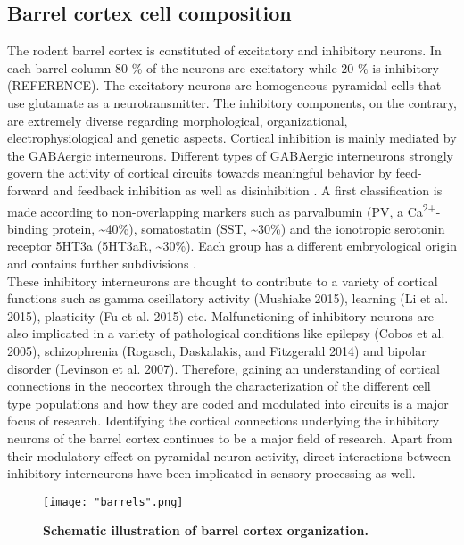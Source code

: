\subsection{Barrel cortex cell composition} 
The rodent barrel cortex is constituted of excitatory and inhibitory neurons. In each barrel column  80 \% of the neurons are excitatory while 20 \% is inhibitory (REFERENCE). The excitatory neurons are homogeneous pyramidal cells that use glutamate as a neurotransmitter. The inhibitory components, on the contrary, are extremely diverse regarding morphological, organizational, electrophysiological and genetic aspects. Cortical inhibition is mainly mediated by the GABAergic interneurons. Different types of GABAergic interneurons strongly govern the activity of cortical circuits towards meaningful behavior by feed-forward and feedback inhibition as well as disinhibition \citep{Staiger2015}. A first classification is made according to non-overlapping markers such as parvalbumin (PV, a Ca\textsuperscript{2+}-binding protein, \textasciitilde40\%), somatostatin (SST, \textasciitilde30\%) and the ionotropic serotonin receptor 5HT3a (5HT3aR, \textasciitilde30\%). Each group has a different embryological origin and contains further subdivisions \citep{Staiger2015,Tremblay2017,Rudy2011}. \\
These inhibitory interneurons are thought to contribute to a variety of cortical functions such as gamma oscillatory activity (Mushiake 2015), learning (Li et al. 2015), plasticity (Fu et al. 2015) etc. Malfunctioning of inhibitory neurons are also implicated in a variety of pathological conditions like epilepsy (Cobos et al. 2005), schizophrenia (Rogasch, Daskalakis, and Fitzgerald 2014) and bipolar disorder (Levinson et al. 2007). Therefore, gaining an understanding of cortical connections in the neocortex through the characterization of the different cell type populations and how they are coded and modulated into circuits is a major focus of research.
Identifying the cortical connections underlying the inhibitory neurons of the barrel cortex continues to be a major field of research. Apart from their modulatory effect on pyramidal neuron activity, direct interactions between inhibitory interneurons have been implicated in sensory processing as well. 
\begin{figure}[!h]
	\captionsetup[figure]{indentation=0pt}
	\texttt{[image: "barrels".png]}
	\caption[Schematic illustration of barrel cortex organization.]{\textbf{Schematic illustration of barrel cortex organization.}}	
	\label{fig:barrel_cortex}
\end{figure}
